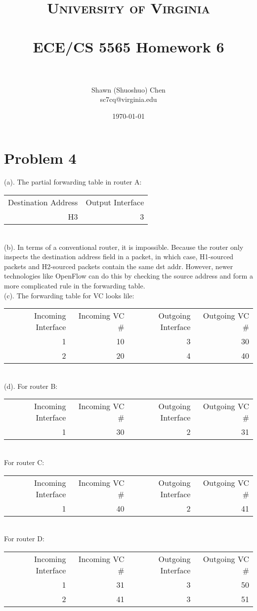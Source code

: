 \documentclass[titlepage, paper=a4, fontsize=11pt]{scrartcl} %
\title{	
\normalfont \normalsize 
\textsc{University of Virginia} \\ [25pt] %
\horrule{0.5pt} \\[0.4cm] %
\huge ECE/CS 5565 Homework 6 \\ %
\horrule{2pt} \\[0.5cm] %
}
\author{Shawn (Shuoshuo) Chen\\sc7cq@virginia.edu} %
\date{\normalsize\today} %
\numberwithin{equation}{section} %
\numberwithin{table}{section} %
\begin{document}
\maketitle %


\section*{Problem 4}
(a).
The partial forwarding table in router A: \\
\begin{tabular}{ r | r }
  Destination Address & Output Interface \\
  H3 & 3 \\
\end{tabular}
\\

(b).
In terms of a conventional router, it is impossible. Because the router only inspects the destination address field in a packet, in which case, H1-sourced packets and H2-sourced packets contain the same dst addr. However, newer technologies like OpenFlow can do this by checking the source address and form a more complicated rule in the forwarding table.
\\

(c).
The forwarding table for VC looks lile: \\
\begin{tabular}{ r | r | r | r }
  Incoming Interface & Incoming VC \# & Outgoing Interface & Outgoing VC \# \\
  1 & 10 & 3 & 30 \\
  2 & 20 & 4 & 40 \\
\end{tabular}
\\

(d).
For router B: \\
\begin{tabular}{ r | r | r | r }
  Incoming Interface & Incoming VC \# & Outgoing Interface & Outgoing VC \# \\
  1 & 30 & 2 & 31 \\
\end{tabular}
\\
For router C: \\
\begin{tabular}{ r | r | r | r }
  Incoming Interface & Incoming VC \# & Outgoing Interface & Outgoing VC \# \\
  1 & 40 & 2 & 41 \\
\end{tabular}
\\
For router D: \\
\begin{tabular}{ r | r | r | r }
  Incoming Interface & Incoming VC \# & Outgoing Interface & Outgoing VC \# \\
  1 & 31 & 3 & 50 \\
  2 & 41 & 3 & 51 \\
\end{tabular}
\\
\end{document}
